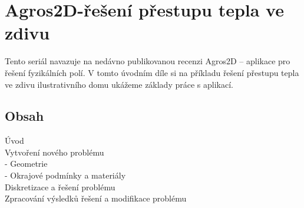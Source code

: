 \documentclass[a4paper, oneside]{article}
\begin{document}
\author{Bc. František MACH, Ing. Pavel Karban, Ph.D.}
\date{\today}
\section{Agros2D-řešení přestupu tepla ve zdivu}
Tento seriál navazuje na nedávno publikovanou recenzi Agros2D – aplikace pro řešení fyzikálních polí. V tomto úvodním díle si na příkladu řešení přestupu tepla ve zdivu ilustrativního domu ukážeme základy práce s aplikací.
\subsection{Obsah}
Úvod\\
Vytvoření nového problému\\
 - Geometrie\\
 - Okrajové podmínky a materiály\\
Diskretizace a řešení problému\\
Zpracování výsledků řešení a modifikace problému\\
\end{document}
